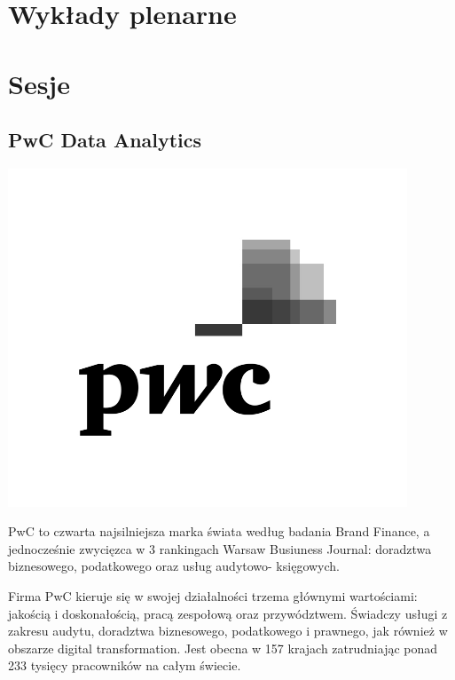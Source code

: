 \documentclass[11pt,twoside,b5paper]{book}
\begin{document}
\chapter{Wykłady plenarne}{}
\newpage  

\newpage

\newpage

\newpage

\newpage

\newpage

\newpage

\newpage

\newpage

\newpage







\chapter{Sesje}{\LARGE}
\newpage
\section{PwC Data Analytics}
\begin{minipage}[t]{0.915\textwidth}
	\center     
    \includegraphics[width=450px]{img/PwC_logo_new.png} 
\end{minipage}

PwC to czwarta najsilniejsza marka świata według badania Brand Finance, a jednocześnie zwycięzca w 3 rankingach Warsaw Busiuness Journal: doradztwa biznesowego, podatkowego oraz usług audytowo- księgowych.

Firma PwC kieruje się w swojej działalności trzema głównymi wartościami: jakością i doskonałością, pracą zespołową oraz przywództwem. Świadczy usługi z zakresu audytu, doradztwa biznesowego, podatkowego i prawnego, jak również w obszarze digital transformation. Jest obecna w 157 krajach zatrudniając ponad 233 tysięcy pracowników na całym świecie.
\end{document}
